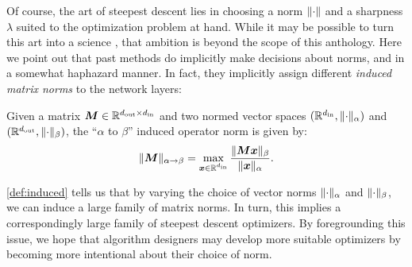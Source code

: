 

Of course, the art of steepest descent lies in choosing a norm $\Vert {\cdot} \Vert$ and a sharpness $\lambda$ suited to the optimization problem at hand. While it may be possible to turn this art into a science \citep{modula}, that ambition is beyond the scope of this anthology. Here we point out that past methods do implicitly make decisions about norms, and in a somewhat haphazard manner. In fact, they implicitly assign different \textit{induced matrix norms} to the network layers:

\begin{mydefinition}\label{def:induced} Given a matrix ${\bm{M}}\in\mathbb{R}^{d_{\mathrm{out}} \times d_{\mathrm{in}}}$ and two normed vector spaces $(\mathbb{R}^{d_{\mathrm{in}}},\Vert {\cdot} \Vert_\alpha)$ and $(\mathbb{R}^{d_{\mathrm{out}}},\Vert {\cdot} \Vert_\beta)$, the ``$\alpha$ to $\beta$'' induced operator norm is given by:
\begin{equation}
    \Vert {{\bm{M}}} \Vert_{\alpha\to\beta} = \max_{\substack{{\bm{x}} \in \mathbb{R}^{d_{\mathrm{in}}}}} 
    \frac{\Vert {{\bm{M}}{\bm{x}}} \Vert_\beta}{\Vert {{\bm{x}}} \Vert_\alpha}.
\end{equation}
\end{mydefinition}
\cref{def:induced} tells us that by varying the choice of vector norms $\Vert {\cdot} \Vert_\alpha$ and $\Vert {\cdot} \Vert_\beta$, we can induce a large family of matrix norms. In turn, this implies a correspondingly large family of steepest descent optimizers. By foregrounding this issue, we hope that algorithm designers may develop more suitable optimizers by becoming more intentional about their choice of norm.
